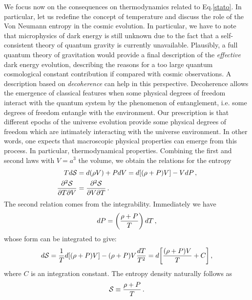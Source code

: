 \documentclass[nofootinbib,prd,superscriptaddress,showpacs,showkeys,]{revtex4}
\begin{document}
We focus now on the consequences on thermodynamics related to  Eq.\eqref{stato}. In particular, let us  redefine the concept of temperature and  discuss the role of the Von Neumann entropy in the cosmic evolution. In particular, we have to note that microphysics of dark energy is still unknown due to the fact that a  self-consistent theory of quantum gravity is currently unavailable. Plausibly, a full quantum theory of gravitation would provide a final description of the \emph{effective} dark energy evolution, describing the reasons for a too large quantum cosmological constant contribution if compared with cosmic observations. A description  based on  \emph{decoherence} can help in this perspective. Decoherence allows the emergence of classical features  when some physical degrees of freedom interact with the quantum system by the phenomenon of entanglement, i.e. some  degrees of freedom entangle with the environment. Our prescription is that different epochs of the universe evolution provide some physical degrees of freedom which are intimately interacting with the universe environment. In other words, one expects that  macroscopic physical properties  can emerge from this process. In particular, thermodynamical properties.
Combining the first and second laws with $V=a^3$ the volume, we  obtain the relations for the entropy
\begin{subequations}
\begin{align}
Td\mathcal S&=d(\rho V)+P dV = d[(\rho+P)V]-V dP\,,\\
{\partial^2 \mathcal S \over \partial T \partial V}&={\partial^2 \mathcal S \over \partial V \partial T}\,.
\end{align}
\end{subequations}
The second relation comes from the  integrability. Immediately we have
\begin{equation}
dP=\left({\rho+P\over T}\right)dT\,,
\end{equation}
whose form can be integrated to give:
\begin{equation}
d\mathcal S= {1\over T} d[(\rho + P)V]-(\rho + P)V {dT\over
T^2}=d\bigg[{(\rho+P)V\over T} + C \bigg]\,,
\end{equation}
where  $C$ is an integration constant. The entropy density naturally follows as
\begin{equation}\label{entrotermo}
\mathcal S \equiv{\rho + P\over T}\,.
\end{equation}
\end{document}
